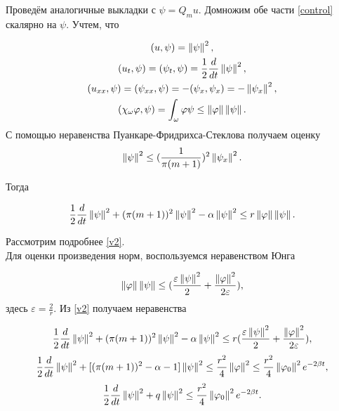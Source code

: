 Проведём аналогичные выкладки с $\psi = Q_m u$. Домножим обе части 
\eqref{control} скалярно на $\psi$. Учтем, что

\begin{gather*}
    (u, \psi) = \left\lVert\psi\right\rVert^2,\\*
    (u_t, \psi) = (\psi_t, \psi) = \frac{1}{2} \frac{d}{dt} \left\lVert\psi\right\rVert^2,\\*
    (u_{xx}, \psi) = (\psi_{xx}, \psi) = -(\psi_x, \psi_x) = -
    \left\lVert\psi_x\right\rVert^2,\\*
    (\chi_{\omega}\varphi, \psi) = \int_{\omega}{\varphi \psi} \le
    \left\lVert\varphi\right\rVert \left\lVert\psi\right\rVert.
\end{gather*}
С помощью неравенства Пуанкаре-Фридрихса-Стеклова получаем оценку
\begin{equation}
    \left\lVert\psi\right\rVert^2 \le (\frac{1}{\pi(m + 1)})^2 \left\lVert\psi_x\right\rVert^2.
\end{equation}

Тогда

\begin{equation}\label{v2}
    \frac{1}{2} \frac{d}{dt} \left\lVert\psi\right\rVert^2 + (\pi(m + 1))^2 \left\lVert\psi\right\rVert^2 - 
    \alpha \left\lVert\psi\right\rVert^2 \le r \left\lVert\varphi\right\rVert \left\lVert\psi\right\rVert.
\end{equation}

Рассмотрим подробнее \eqref{v2}.\\
Для оценки произведения норм, воспользуемся неравенством Юнга

\begin{equation*}
    \left\lVert\varphi\right\rVert \left\lVert\psi\right\rVert \le (\frac{\varepsilon \left\lVert\psi\right\rVert^2}{2} + 
    \frac{\left\lVert\varphi\right\rVert^2}{2 \varepsilon}),
\end{equation*}
здесь $\varepsilon = \frac{2}{r}$. Из \eqref{v2} получаем неравенства

\begin{equation*}
    \frac{1}{2} \frac{d}{dt} \left\lVert\psi\right\rVert^2 + (\pi(m + 1))^2 \left\lVert\psi\right\rVert^2 - 
    \alpha \left\lVert\psi\right\rVert^2 \le r (\frac{\varepsilon \left\lVert\psi\right\rVert^2}{2} + 
    \frac{\left\lVert\varphi\right\rVert^2}{2 \varepsilon}),
\end{equation*}
\begin{equation*}
    \frac{1}{2} \frac{d}{dt} \left\lVert\psi\right\rVert^2  + [(\pi(m + 1))^2 - \alpha - 1] 
    \left\lVert\psi\right\rVert^2 \le \frac{r^2}{4}\left\lVert\varphi\right\rVert^2 \le 
    \frac{r^2}{4}\left\lVert\varphi_0\right\rVert^2 e^{-2\beta t},
\end{equation*}
\begin{equation}
    \frac{1}{2} \frac{d}{dt} \left\lVert\psi\right\rVert^2 + q\left\lVert\psi\right\rVert^2 \le 
    \frac{r^2}{4}\left\lVert\varphi_0\right\rVert^2 e^{-2\beta t}.
\end{equation}

